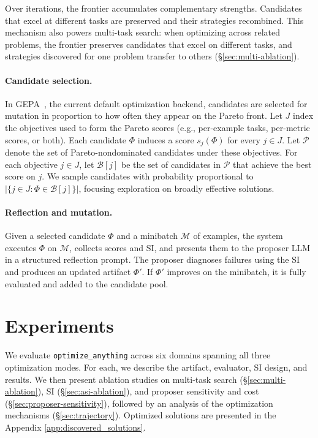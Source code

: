 \documentclass[sigconf]{acmart}
\newcommand{\oa}{\texttt{optimize\_anything}}
\newcommand{\asi}{SI}
\begin{document}
Over iterations, the frontier accumulates complementary strengths. Candidates that excel at different tasks are preserved and their strategies recombined. This mechanism also powers multi-task search: when optimizing across related problems, the frontier preserves candidates that excel on different tasks, and strategies discovered for one problem transfer to others (\S\ref{sec:multi-ablation}).

\paragraph{Candidate selection.} In GEPA~\cite{agrawal2026gepa}, the current default optimization backend, candidates are selected for mutation in proportion to how often they appear on the Pareto front. Let $J$ index the objectives used to form the Pareto scores (e.g., per-example tasks, per-metric scores, or both). Each candidate $\Phi$ induces a score $s_j(\Phi)$ for every $j\in J$. Let $\mathcal{P}$ denote the set of Pareto-nondominated candidates under these objectives. For each objective $j\in J$, let $\mathcal{B}[j]$ be the set of candidates in $\mathcal{P}$ that achieve the best score on $j$. We sample candidates with probability proportional to $|\{j\in J : \Phi \in \mathcal{B}[j]\}|$, focusing exploration on broadly effective solutions.

\paragraph{Reflection and mutation.} Given a selected candidate $\Phi$ and a minibatch $\mathcal{M}$ of examples, the system executes $\Phi$ on $\mathcal{M}$, collects scores and \asi{}, and presents them to the proposer LLM in a structured reflection prompt. The proposer diagnoses failures using the \asi{} and produces an updated artifact $\Phi'$. If $\Phi'$ improves on the minibatch, it is fully evaluated and added to the candidate pool.


\section{Experiments}\label{sec:experiments}

We evaluate \oa{} across six domains spanning all three optimization modes. For each, we describe the artifact, evaluator, \asi{} design, and results. We then present ablation studies on multi-task search (\S\ref{sec:multi-ablation}), \asi{} (\S\ref{sec:asi-ablation}), and proposer sensitivity and cost (\S\ref{sec:proposer-sensitivity}), followed by an analysis of the optimization mechanisms (\S\ref{sec:trajectory}).
Optimized solutions are presented in the Appendix \ref{app:discovered_solutions}.
\end{document}
